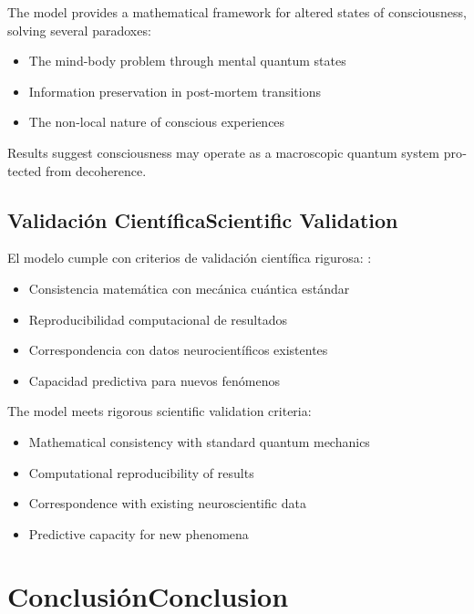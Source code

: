 \documentclass[12pt,a4paper]{article}
\newcommand{\es}[1]{\foreignlanguage{spanish}{#1}}
\newcommand{\en}[1]{\foreignlanguage{english}{#1}}
\begin{document}
\begin{otherlanguage}{english}
The model provides a mathematical framework for altered states of consciousness, solving several paradoxes:
\begin{itemize}
\item The mind-body problem through mental quantum states
\item Information preservation in post-mortem transitions
\item The non-local nature of conscious experiences
\end{itemize}

Results suggest consciousness may operate as a macroscopic quantum system protected from decoherence.
\end{otherlanguage}

\subsection{\es{Validación Científica}\en{Scientific Validation}}

\begin{otherlanguage}{spanish}
El modelo cumple con criterios de validación científica rigurosa: \cite{tegmark2000, fisher2015}:
\begin{itemize}
\item Consistencia matemática con mecánica cuántica estándar
\item Reproducibilidad computacional de resultados
\item Correspondencia con datos neurocientíficos existentes
\item Capacidad predictiva para nuevos fenómenos
\end{itemize}
\end{otherlanguage}

\begin{otherlanguage}{english}
The model meets rigorous scientific validation criteria:
\begin{itemize}
\item Mathematical consistency with standard quantum mechanics
\item Computational reproducibility of results
\item Correspondence with existing neuroscientific data
\item Predictive capacity for new phenomena
\end{itemize}
\end{otherlanguage}

\section{\es{Conclusión}\en{Conclusion}}
\end{document}
